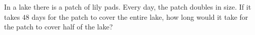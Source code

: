 In a lake there is a patch of lily pads. Every day, the patch doubles in size. If it takes $48$ days for the patch to cover the entire lake, how long would it take for the patch to cover half of the lake?
